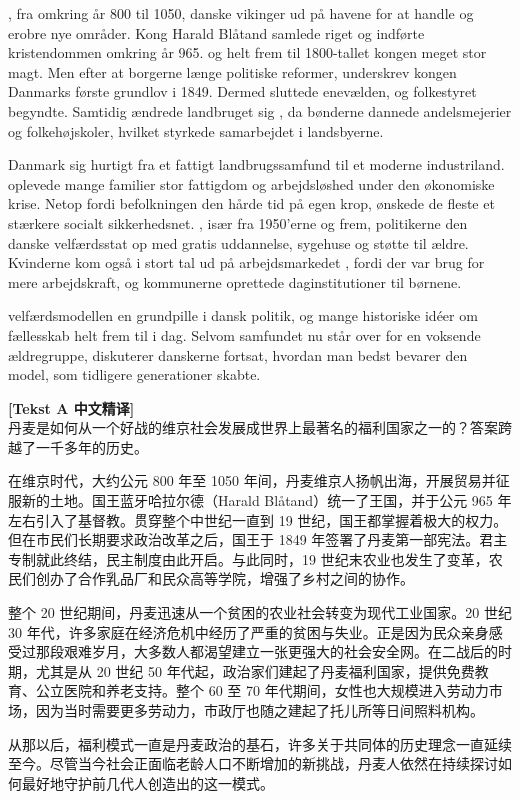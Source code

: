 , fra omkring år 800 til 1050,  danske vikinger ud på havene for at handle og erobre nye områder. Kong Harald Blåtand samlede riget og indførte kristendommen omkring år 965.  og helt frem til 1800-tallet  kongen meget stor magt. Men efter at borgerne længe  politiske reformer, underskrev kongen Danmarks første grundlov i 1849. Dermed sluttede enevælden, og folkestyret begyndte. Samtidig ændrede landbruget sig , da bønderne dannede andelsmejerier og folkehøjskoler, hvilket styrkede samarbejdet i landsbyerne.

  Danmark sig hurtigt fra et fattigt landbrugssamfund til et moderne industriland.  oplevede mange familier stor fattigdom og arbejdsløshed under den økonomiske krise. Netop fordi befolkningen  den hårde tid på egen krop, ønskede de fleste et stærkere socialt sikkerhedsnet. , især fra 1950'erne og frem,  politikerne den danske velfærdsstat op med gratis uddannelse, sygehuse og støtte til ældre. Kvinderne kom også i stort tal ud på arbejdsmarkedet , fordi der var brug for mere arbejdskraft, og kommunerne oprettede daginstitutioner til børnene.

 velfærdsmodellen  en grundpille i dansk politik, og mange historiske idéer om fællesskab  helt frem til i dag. Selvom samfundet nu står over for en voksende ældregruppe, diskuterer danskerne fortsat, hvordan man bedst bevarer den model, som tidligere generationer skabte.

\begin{transbox}
\small
\textbf{\color{NCDTeal}[Tekst A 中文精译]}\\
丹麦是如何从一个好战的维京社会发展成世界上最著名的福利国家之一的？答案跨越了一千多年的历史。

在维京时代，大约公元 800 年至 1050 年间，丹麦维京人扬帆出海，开展贸易并征服新的土地。国王蓝牙哈拉尔德（Harald Blåtand）统一了王国，并于公元 965 年左右引入了基督教。贯穿整个中世纪一直到 19 世纪，国王都掌握着极大的权力。但在市民们长期要求政治改革之后，国王于 1849 年签署了丹麦第一部宪法。君主专制就此终结，民主制度由此开启。与此同时，19 世纪末农业也发生了变革，农民们创办了合作乳品厂和民众高等学院，增强了乡村之间的协作。

整个 20 世纪期间，丹麦迅速从一个贫困的农业社会转变为现代工业国家。20 世纪 30 年代，许多家庭在经济危机中经历了严重的贫困与失业。正是因为民众亲身感受过那段艰难岁月，大多数人都渴望建立一张更强大的社会安全网。在二战后的时期，尤其是从 20 世纪 50 年代起，政治家们建起了丹麦福利国家，提供免费教育、公立医院和养老支持。整个 60 至 70 年代期间，女性也大规模进入劳动力市场，因为当时需要更多劳动力，市政厅也随之建起了托儿所等日间照料机构。

从那以后，福利模式一直是丹麦政治的基石，许多关于共同体的历史理念一直延续至今。尽管当今社会正面临老龄人口不断增加的新挑战，丹麦人依然在持续探讨如何最好地守护前几代人创造出的这一模式。
\end{transbox}

